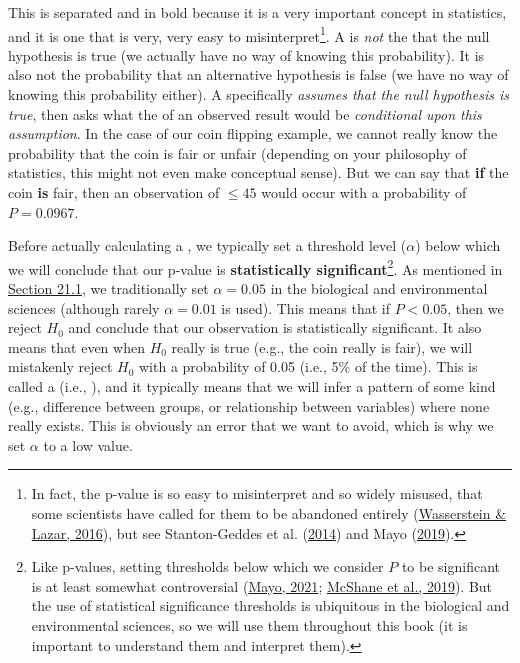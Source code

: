 \documentclass[
  openany]{krantz}
\begin{document}
This is separated and in bold because it is a very important concept in statistics, and it is one that is very, very easy to misinterpret\footnote{In fact, the p-value is so easy to misinterpret and so widely misused, that some scientists have called for them to be abandoned entirely (\protect\hyperlink{ref-Wasserstein2016}{Wasserstein \& Lazar, 2016}), but see Stanton-Geddes et al. (\protect\hyperlink{ref-Stanton-Geddes2014}{2014}) and Mayo (\protect\hyperlink{ref-Mayo2019}{2019}).}.
A  is \emph{not} the  that the null hypothesis is true (we actually have no way of knowing this probability).
It is also not the probability that an alternative hypothesis is false (we have no way of knowing this probability either).
A  specifically \emph{assumes that the null hypothesis is true}, then asks what the  of an observed result would be \emph{conditional upon this assumption}.
In the case of our coin flipping example, we cannot really know the probability that the coin is fair or unfair (depending on your philosophy of statistics, this might not even make conceptual sense).
But we can say that \textbf{if} the coin \textbf{is} fair, then an observation of \(\leq 45\) would occur with a probability of \(P = 0.0967\).

Before actually calculating a , we typically set a threshold level (\(\alpha\)) below which we will conclude that our p-value is \textbf{statistically significant}\footnote{Like p-values, setting thresholds below which we consider \(P\) to be significant is at least somewhat controversial (\protect\hyperlink{ref-Mayo2021}{Mayo, 2021}; \protect\hyperlink{ref-McShane2019}{McShane et al., 2019}). But the use of statistical significance thresholds is ubiquitous in the biological and environmental sciences, so we will use them throughout this book (it is important to understand them and interpret them).}.
As mentioned in \protect\hyperlink{how-ridiculous-is-our-hypothesis}{Section 21.1}, we traditionally set \(\alpha= 0.05\) in the biological and environmental sciences (although rarely \(\alpha = 0.01\) is used).
This means that if \(P < 0.05\), then we reject \(H_{0}\) and conclude that our observation is statistically significant.
It also means that even when \(H_{0}\) really is true (e.g., the coin really is fair), we will mistakenly reject \(H_{0}\) with a probability of 0.05 (i.e., 5\% of the time).
This is called a \textbf{} (i.e., ), and it typically means that we will infer a pattern of some kind (e.g., difference between groups, or relationship between variables) where none really exists.
This is obviously an error that we want to avoid, which is why we set \(\alpha\) to a low value.
\end{document}
